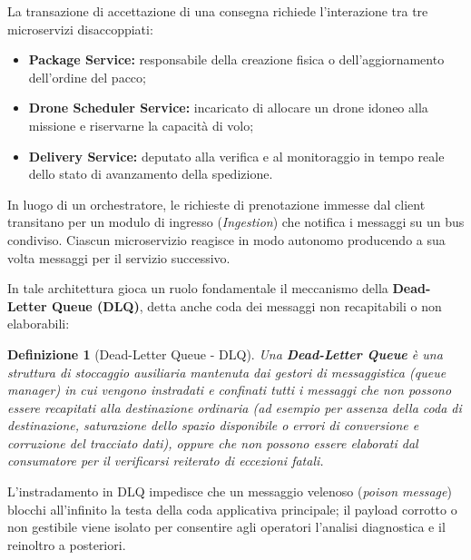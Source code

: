 \documentclass[11pt, a4paper]{article}
\newtheorem{theorem}{Definizione}
\begin{document}

La transazione di accettazione di una consegna richiede l'interazione tra tre microservizi disaccoppiati:
\begin{itemize}[noitemsep]
    \item \textbf{Package Service:} responsabile della creazione fisica o dell'aggiornamento dell'ordine del pacco;
    \item \textbf{Drone Scheduler Service:} incaricato di allocare un drone idoneo alla missione e riservarne la capacità di volo;
    \item \textbf{Delivery Service:} deputato alla verifica e al monitoraggio in tempo reale dello stato di avanzamento della spedizione.
\end{itemize}

In luogo di un orchestratore, le richieste di prenotazione immesse dal client transitano per un modulo di ingresso (\emph{Ingestion}) che notifica i messaggi su un bus condiviso. Ciascun microservizio reagisce in modo autonomo producendo a sua volta messaggi per il servizio successivo.

In tale architettura gioca un ruolo fondamentale il meccanismo della \textbf{Dead-Letter Queue (DLQ)}, detta anche coda dei messaggi non recapitabili o non elaborabili:

\begin{theorem}[Dead-Letter Queue - DLQ]
Una \textbf{Dead-Letter Queue} è una struttura di stoccaggio ausiliaria mantenuta dai gestori di messaggistica (\emph{queue manager}) in cui vengono instradati e confinati tutti i messaggi che non possono essere recapitati alla destinazione ordinaria (ad esempio per assenza della coda di destinazione, saturazione dello spazio disponibile o errori di conversione e corruzione del tracciato dati), oppure che non possono essere elaborati dal consumatore per il verificarsi reiterato di eccezioni fatali.
\end{theorem}

L'instradamento in DLQ impedisce che un messaggio velenoso (\emph{poison message}) blocchi all'infinito la testa della coda applicativa principale; il payload corrotto o non gestibile viene isolato per consentire agli operatori l'analisi diagnostica e il reinoltro a posteriori.

\newpage
\end{document}
